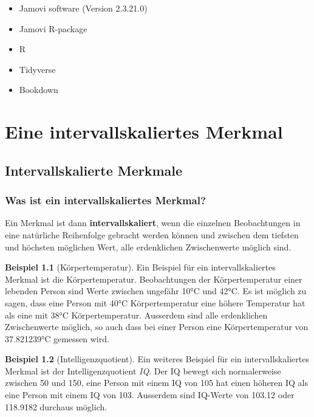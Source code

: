 \documentclass[
]{book}
\providecommand{\tightlist}{%
  \setlength{\itemsep}{0pt}\setlength{\parskip}{0pt}}
\theoremstyle{definition}
\theoremstyle{definition}
\newtheorem{example}{Beispiel}[chapter]
\theoremstyle{definition}
\theoremstyle{definition}
\theoremstyle{remark}
\begin{document}
\begin{itemize}
\tightlist
\item
  Jamovi software (Version 2.3.21.0)
\item
  Jamovi R-package \citep{R-jmv}
\item
  R \citep{R-base}
\item
  Tidyverse \citep{tidyverse2019}
\item
  Bookdown \citep{bookdown2016}
\end{itemize}

\part{Eine intervallskaliertes Merkmal}\label{part-eine-intervallskaliertes-merkmal}

\chapter{Intervallskalierte Merkmale}\label{intervallskalierte-merkmale}

\section{Was ist ein intervallskaliertes Merkmal?}\label{intervallskalierte-merkmale-definition}

\label{customdef-intervallskaliert}{Ein Merkmal ist dann \textbf{intervallskaliert}, wenn die einzelnen Beobachtungen in eine natürliche Reihenfolge gebracht werden können und zwischen dem tiefsten und höchsten möglichen Wert, alle erdenklichen Zwischenwerte möglich sind.}

\begin{example}[Körpertemperatur]
\protect\hypertarget{exm:humtemp}{}\label{exm:humtemp}Ein Beispiel für ein intervallskaliertes Merkmal ist die Körpertemperatur. Beobachtungen der Körpertemperatur einer lebenden Person sind Werte zwischen ungefähr 10°C und 42°C. Es ist möglich zu sagen, dass eine Person mit 40°C Körpertemperatur eine höhere Temperatur hat als eine mit 38°C Körpertemperatur. Ausserdem sind alle erdenklichen Zwischenwerte möglich, so auch dass bei einer Person eine Körpertemperatur von 37.821239°C gemessen wird.
\end{example}

\begin{example}[Intelligenzquotient]
\protect\hypertarget{exm:iq}{}\label{exm:iq}Ein weiteres Beispiel für ein intervallskaliertes Merkmal ist der Intelligenzquotient \emph{IQ}. Der IQ bewegt sich normalerweise zwischen 50 und 150, eine Person mit einem IQ von 105 hat einen höheren IQ als eine Person mit einem IQ von 103. Ausserdem sind IQ-Werte von 103.12 oder 118.9182 durchaus möglich.
\end{example}
\end{document}

